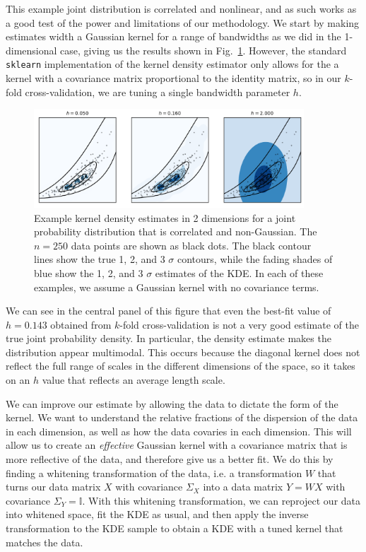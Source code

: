 This example joint distribution is correlated and nonlinear, and as such works as a good test of the power and limitations of our methodology. We start by making estimates width a Gaussian kernel for a range of bandwidths as we did in the 1-dimensional case, giving us the results shown in Fig.~\ref{fig:2d_scatter_unscaled}. However, the standard \verb|sklearn| implementation of the kernel density estimator only allows for the a kernel with a covariance matrix  proportional to the identity matrix, so in our $k$-fold cross-validation, we are tuning a single bandwidth parameter $h$.

\begin{figure}
    \centering
    \includegraphics[width=0.9\textwidth]{figures/snemo_kde/2d_scatter_no_scaling.pdf}
    \caption{Example kernel density estimates in 2 dimensions for a joint probability distribution that is correlated and non-Gaussian. The $n=250$ data points are shown as black dots. The black contour lines show the true 1, 2, and 3 $\sigma$ contours, while the fading shades of blue show the 1, 2, and 3 $\sigma$ estimates of the KDE. In each of these examples, we assume a Gaussian kernel with no covariance terms.}
    \label{fig:2d_scatter_unscaled}
\end{figure}

We can see in the central panel of this figure that even the best-fit value of $h=0.143$ obtained from $k$-fold cross-validation is not a very good estimate of the true joint probability density. In particular, the density estimate makes the distribution appear multimodal. This occurs because the diagonal kernel does not reflect the full range of scales in the different dimensions of the space, so it takes on an $h$ value that reflects an average length scale.

We can improve our estimate by allowing the data to dictate the form of the kernel. We want to understand the relative fractions of the dispersion of the data in each dimension, as well as how the data covaries in each dimension. This will allow us to create an \emph{effective} Gaussian kernel with a covariance matrix that is more reflective of the data, and therefore give us a better fit. We do this by finding a whitening transformation of the data, i.e. a transformation $W$ that turns our data matrix $X$ with covariance $\Sigma_X$ into a data matrix $Y=WX$ with covariance $\Sigma_Y=\mathbb{I}$. With this whitening transformation, we can reproject our data into whitened space, fit the KDE as usual, and then apply the inverse transformation to the KDE sample to obtain a KDE with a tuned kernel that matches the data.

